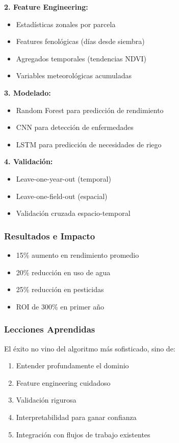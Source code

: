 \documentclass[12pt,a4paper]{article}
\begin{document}
\textbf{2. Feature Engineering:}
\begin{itemize}
    \item Estadísticas zonales por parcela
    \item Features fenológicas (días desde siembra)
    \item Agregados temporales (tendencias NDVI)
    \item Variables meteorológicas acumuladas
\end{itemize}

\textbf{3. Modelado:}
\begin{itemize}
    \item Random Forest para predicción de rendimiento
    \item CNN para detección de enfermedades
    \item LSTM para predicción de necesidades de riego
\end{itemize}

\textbf{4. Validación:}
\begin{itemize}
    \item Leave-one-year-out (temporal)
    \item Leave-one-field-out (espacial)
    \item Validación cruzada espacio-temporal
\end{itemize}

\subsubsection{Resultados e Impacto}

\begin{itemize}
    \item 15\% aumento en rendimiento promedio
    \item 20\% reducción en uso de agua
    \item 25\% reducción en pesticidas
    \item ROI de 300\% en primer año
\end{itemize}

\subsubsection{Lecciones Aprendidas}

\begin{reflexion}
El éxito no vino del algoritmo más sofisticado, sino de:
\begin{enumerate}
    \item Entender profundamente el dominio
    \item Feature engineering cuidadoso
    \item Validación rigurosa
    \item Interpretabilidad para ganar confianza
    \item Integración con flujos de trabajo existentes
\end{enumerate}
\end{reflexion}
\end{document}
